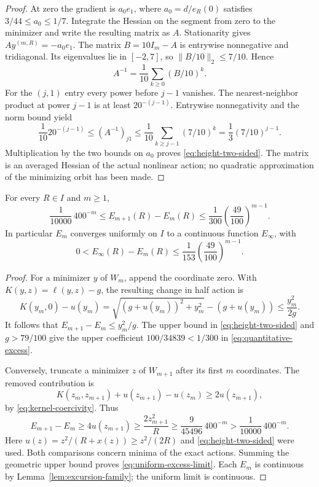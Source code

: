 \begin{proof}
At zero the gradient is $a_0 e_1$, where
$a_0=d/e_R(0)$ satisfies $3/44\le a_0\le1/7$.
Integrate the Hessian on the segment from zero to the minimizer and
write the resulting matrix as $A$. Stationarity gives
$Ay^{(m,R)}=-a_0e_1$. The matrix $B=10I_m-A$ is entrywise
nonnegative and tridiagonal. Its eigenvalues lie in $[-2,7]$, so
$\|B/10\|_2\le7/10$. Hence
\[
 A^{-1}=\frac1{10}\sum_{k\ge0}(B/10)^k.
\]
For the $(j,1)$ entry every power before $j-1$ vanishes. The
nearest-neighbor product at power $j-1$ is at least $20^{-(j-1)}$.
Entrywise nonnegativity and the norm bound yield
\[
 \frac1{10}20^{-(j-1)}
 \le (A^{-1})_{j1}
 \le\frac1{10}\sum_{k\ge j-1}(7/10)^k
 =\frac13(7/10)^{j-1}.
\]
Multiplication by the two bounds on $a_0$ proves
\eqref{eq:height-two-sided}. The matrix is an averaged Hessian of
the actual nonlinear action; no quadratic approximation of the
minimizing orbit has been made.
\end{proof}

\begin{theorem}
\label{thm:quantitative-excess}
For every $R\in I$ and $m\ge1$,
\begin{equation}\label{eq:quantitative-excess}
 \frac1{10000}\,400^{-m}
 \le E_{m+1}(R)-E_m(R)
 \le\frac1{300}\left(\frac{49}{100}\right)^{m-1}.
\end{equation}
In particular $E_m$ converges uniformly on $I$ to a continuous
function $E_\infty$, with
\begin{equation}\label{eq:uniform-excess-limit}
 0<E_\infty(R)-E_m(R)
 \le\frac1{153}\left(\frac{49}{100}\right)^{m-1}.
\end{equation}
\end{theorem}
\begin{proof}
For a minimizer $y$ of $W_m$, append the coordinate zero. With
$K(y,z)=\ell(y,z)-g$, the resulting change in half action is
\[
 K(y_m,0)-u(y_m)
 =\sqrt{(g+u(y_m))^2+y_m^2}-(g+u(y_m))
 \le\frac{y_m^2}{2g}.
\]
It follows that $E_{m+1}-E_m\le y_m^2/g$. The upper bound in
\eqref{eq:height-two-sided} and $g>79/100$ give the upper
coefficient $100/34839<1/300$ in \eqref{eq:quantitative-excess}.

Conversely, truncate a minimizer $z$ of $W_{m+1}$ after its first
$m$ coordinates. The removed contribution is
\[
 K(z_m,z_{m+1})+u(z_{m+1})-u(z_m)\ge2u(z_{m+1}),
\]
by \eqref{eq:kernel-coercivity}. Thus
\[
 E_{m+1}-E_m\ge4u(z_{m+1})\ge\frac{2z_{m+1}^2}{R}
 \ge\frac9{45496}\,400^{-m}>\frac1{10000}\,400^{-m}.
\]
Here $u(z)=z^2/(R+x(z))\ge z^2/(2R)$ and
\eqref{eq:height-two-sided} were used. Both comparisons concern
minima of the exact actions. Summing the geometric upper bound
proves \eqref{eq:uniform-excess-limit}. Each $E_m$ is continuous
by Lemma~\ref{lem:excursion-family}; the uniform limit is continuous.
\end{proof}


